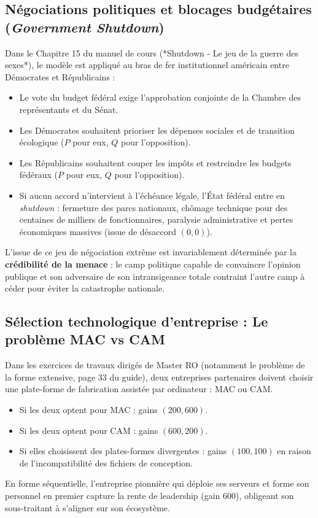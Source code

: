\documentclass[11pt,a4paper]{article}
\begin{document}
\subsection{Négociations politiques et blocages budgétaires (\emph{Government Shutdown})}
Dans le Chapitre 15 du manuel de cours (*Shutdown - Le jeu de la guerre des sexes*), le modèle est appliqué au bras de fer institutionnel américain entre Démocrates et Républicains :
\begin{itemize}[leftmargin=1.5em]
    \item Le vote du budget fédéral exige l'approbation conjointe de la Chambre des représentants et du Sénat.
    \item Les Démocrates souhaitent prioriser les dépenses sociales et de transition écologique ($P$ pour eux, $Q$ pour l'opposition).
    \item Les Républicains souhaitent couper les impôts et restreindre les budgets fédéraux ($P$ pour eux, $Q$ pour l'opposition).
    \item Si aucun accord n'intervient à l'échéance légale, l'État fédéral entre en \emph{shutdown} : fermeture des parcs nationaux, chômage technique pour des centaines de milliers de fonctionnaires, paralysie administrative et pertes économiques massives (issue de désaccord $(0, 0)$).
\end{itemize}
L'issue de ce jeu de négociation extrême est invariablement déterminée par la \textbf{crédibilité de la menace} : le camp politique capable de convaincre l'opinion publique et son adversaire de son intransigeance totale contraint l'autre camp à céder pour éviter la catastrophe nationale.

\subsection{Sélection technologique d'entreprise : Le problème MAC vs CAM}
Dans les exercices de travaux dirigés de Master RO (notamment le problème de la forme extensive, page 33 du guide), deux entreprises partenaires doivent choisir une plate-forme de fabrication assistée par ordinateur : MAC ou CAM.
\begin{itemize}[leftmargin=1.5em]
    \item Si les deux optent pour MAC : gains $(200, 600)$.
    \item Si les deux optent pour CAM : gains $(600, 200)$.
    \item Si elles choisissent des plates-formes divergentes : gains $(100, 100)$ en raison de l'incompatibilité des fichiers de conception.
\end{itemize}
En forme séquentielle, l'entreprise pionnière qui déploie ses serveurs et forme son personnel en premier capture la rente de leadership (gain 600), obligeant son sous-traitant à s'aligner sur son écosystème.
\end{document}

